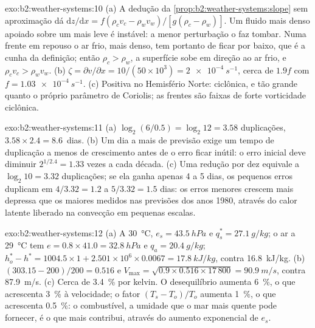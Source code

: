 \begin{solution}{exo:b2:weather-systems:10}
(a) A dedução da \cref{prop:b2:weather-systems:slope} sem aproximação dá
$\mathrm{d}z/\mathrm{d}x = f(\rho_c v_c - \rho_w v_w)/[g(\rho_c - \rho_w)]$. Um fluido mais denso
apoiado sobre um mais leve é instável: a menor perturbação o faz tombar. Numa frente em
repouso o ar frio, mais denso, tem portanto de ficar por baixo, que é a cunha da definição; então
$\rho_c > \rho_w$, a superfície sobe em direção ao ar frio, e $\rho_c v_c > \rho_w v_w$.
(b) $\zeta = \partial v/\partial x = 10/(50 \times 10^3) = \qty{2e-4}{s^{-1}}$, cerca de $1.9f$ com
$f = \qty{1.03e-4}{s^{-1}}$. (c) Positiva no Hemisfério Norte: ciclônica, e tão grande quanto
o próprio parâmetro de Coriolis; as frentes são faixas de forte vorticidade ciclônica.
\end{solution}

\begin{solution}{exo:b2:weather-systems:11}
(a) $\log_2(6/0.5) = \log_2 12 = 3.58$ duplicações, $3.58 \times 2.4 = 8.6$~dias. (b) Um
dia a mais de previsão exige um tempo de duplicação a menos de crescimento antes de o erro ficar inútil: o
erro inicial deve diminuir $2^{1/2.4} = 1.33$ vezes a cada década. (c) Uma redução por dez equivale a
$\log_2 10 = 3.32$ duplicações; se ela ganha apenas 4 a 5 dias, os pequenos erros duplicam em $4/3.32 = 1.2$
a $5/3.32 = 1.5$ dias: os erros menores crescem mais depressa que os maiores medidos nas
previsões dos anos 1980, através do calor latente liberado na convecção em pequenas escalas.
\end{solution}

\begin{solution}{exo:b2:weather-systems:12}
(a) A \qty{30}{\celsius}, $e_s = \qty{43.5}{hPa}$ e $q_s^* = \qty{27.1}{g/kg}$; o ar a
\qty{29}{\celsius} tem $e = 0.8 \times 41.0 = \qty{32.8}{hPa}$ e $q_a = \qty{20.4}{g/kg}$;
$h_o^* - h^* = 1004.5 \times 1 + 2.501 \times 10^6 \times 0.0067 = \qty{17.8}{kJ/kg}$, contra
\qty{16.8}{kJ/kg}. (b) $(303.15 - 200)/200 = 0.516$ e $V_{\max} = \sqrt{0.9 \times 0.516
\times 17\,800} = \qty{90.9}{m/s}$, contra \qty{87.9}{m/s}. (c) Cerca de \qty{3.4}{\percent} por
kelvin. O desequilíbrio aumenta \qty{6}{\percent}, o que acrescenta \qty{3}{\percent} à velocidade;
o fator $(T_s - T_o)/T_o$ aumenta \qty{1}{\percent}, o que acrescenta \qty{0.5}{\percent}: o
combustível, a umidade que o mar mais quente pode fornecer, é o que mais contribui, através do aumento exponencial de
$e_s$.
\end{solution}

